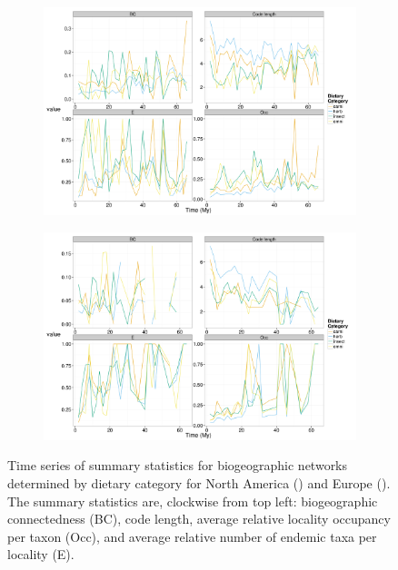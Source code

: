 \documentclass[12pt,letterpaper]{article}
\begin{document}
\begin{figure}[ht]
  \begin{center}
    \begin{subfigure}[b]{0.4\textwidth}
      \caption{}
      \includegraphics[width = \textwidth, keepaspectratio = true]{figure/na_dt}
      \label{subfig:diet_con_na}
    \end{subfigure}
    \begin{subfigure}[b]{0.4\textwidth}
      \caption{}
      \includegraphics[width = \textwidth, keepaspectratio = true]{figure/er_dt}
      \label{subfig:diet_con_er}
    \end{subfigure}
  \end{center}
  \caption[Dietary category based community connectedness]{Time series of summary statistics for biogeographic networks determined by dietary category for North America () and Europe (). The summary statistics are, clockwise from top left: biogeographic connectedness (BC), code length, average relative locality occupancy per taxon (Occ), and average relative number of endemic taxa per locality (E).} 
  \label{fig:diet_con}
\end{figure}
\end{document}
